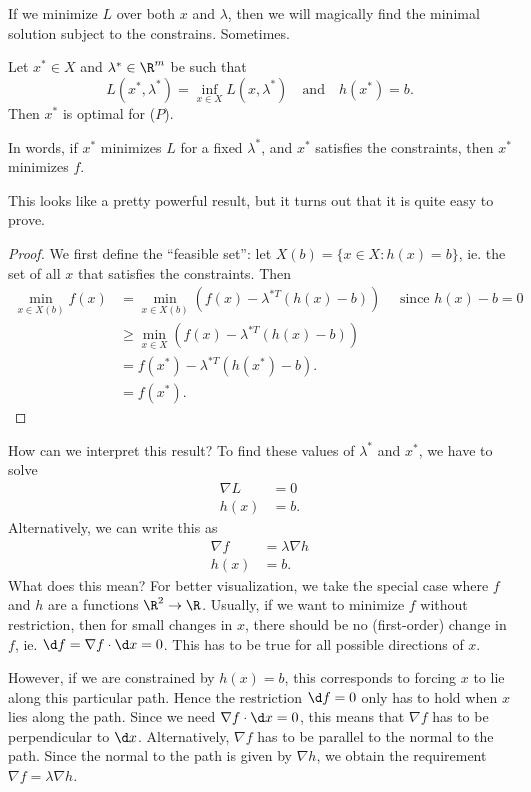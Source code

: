\documentclass[a4paper]{article}
\begin{document}
If we minimize $L$ over both $x$ and $\lambda$, then we will magically find the minimal solution subject to the constrains. Sometimes.

\begin{thm}
  Let $x^*\in X$ and $\lambda^*\in \R^m$ be such that
  \[
    L(x^* ,\lambda^*) = \inf_{x\in X}L(x, \lambda^*)\quad\text{and}\quad h(x^*) = b.
  \]
  Then $x^*$ is optimal for ($P$).

  In words, if $x^*$ minimizes $L$ for a fixed $\lambda^*$, and $x^*$ satisfies the constraints, then $x^*$ minimizes $f$.
\end{thm}
This looks like a pretty powerful result, but it turns out that it is quite easy to prove.

\begin{proof}
  We first define the ``feasible set'': let $X(b) = \{x\in X: h(x) = b\}$, ie. the set of all $x$ that satisfies the constraints. Then
  \begin{align*}
    \min_{x\in X(b)} f(x) &= \min_{x\in X(b)} (f(x) - \lambda^{*T}(h(x) - b))\quad\text{ since $h(x) - b = 0$}\\
    &\geq \min_{x\in X} (f(x) - \lambda^{*T}(h(x) - b))\\
    &= f(x^*) - \lambda^{*T}(h(x^*) - b).\\
    &= f(x^*).
  \end{align*}
\end{proof}
How can we interpret this result? To find these values of $\lambda^*$ and $x^*$, we have to solve
\begin{align*}
  \nabla L &= 0\\
  h(x) &= b.
\end{align*}
Alternatively, we can write this as
\begin{align*}
  \nabla f &= \lambda \nabla h\\
  h(x) &= b.
\end{align*}
What does this mean? For better visualization, we take the special case where $f$ and $h$ are a functions $\R^2 \to \R$. Usually, if we want to minimize $f$ without restriction, then for small changes in $x$, there should be no (first-order) change in $f$, ie. $\d f = \nabla f\cdot \d x = 0$. This has to be true for all possible directions of $x$.

However, if we are constrained by $h(x) = b$, this corresponds to forcing $x$ to lie along this particular path. Hence the restriction $\d f = 0$ only has to hold when $x$ lies along the path. Since we need $\nabla f\cdot \d x = 0$, this means that $\nabla f$ has to be perpendicular to $\d x$. Alternatively, $\nabla f$ has to be parallel to the normal to the path. Since the normal to the path is given by $\nabla h$, we obtain the requirement $\nabla f = \lambda \nabla h$.
\end{document}
